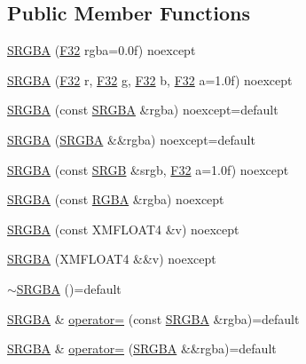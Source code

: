 \subsection*{Public Member Functions}
\begin{DoxyCompactItemize}
\item 
\hyperlink{structmage_1_1_s_r_g_b_a_ac7f39423da637e68377b5986a60855f2}{S\+R\+G\+BA} (\hyperlink{namespacemage_aa97e833b45f06d60a0a9c4fc22ae02c0}{F32} rgba=0.\+0f) noexcept
\item 
\hyperlink{structmage_1_1_s_r_g_b_a_a3497aed51744d2c91523916c0532bd86}{S\+R\+G\+BA} (\hyperlink{namespacemage_aa97e833b45f06d60a0a9c4fc22ae02c0}{F32} r, \hyperlink{namespacemage_aa97e833b45f06d60a0a9c4fc22ae02c0}{F32} g, \hyperlink{namespacemage_aa97e833b45f06d60a0a9c4fc22ae02c0}{F32} b, \hyperlink{namespacemage_aa97e833b45f06d60a0a9c4fc22ae02c0}{F32} a=1.\+0f) noexcept
\item 
\hyperlink{structmage_1_1_s_r_g_b_a_acdbff499c741c0014c578929b1bcd475}{S\+R\+G\+BA} (const \hyperlink{structmage_1_1_s_r_g_b_a}{S\+R\+G\+BA} \&rgba) noexcept=default
\item 
\hyperlink{structmage_1_1_s_r_g_b_a_ad8f7ac337a16d5bf5ae3b8b94d9fe49f}{S\+R\+G\+BA} (\hyperlink{structmage_1_1_s_r_g_b_a}{S\+R\+G\+BA} \&\&rgba) noexcept=default
\item 
\hyperlink{structmage_1_1_s_r_g_b_a_a23489bb22c8249c8d997b93e90e450da}{S\+R\+G\+BA} (const \hyperlink{structmage_1_1_s_r_g_b}{S\+R\+GB} \&srgb, \hyperlink{namespacemage_aa97e833b45f06d60a0a9c4fc22ae02c0}{F32} a=1.\+0f) noexcept
\item 
\hyperlink{structmage_1_1_s_r_g_b_a_a17b38cf5574d403a22e0bacbfc1c9416}{S\+R\+G\+BA} (const \hyperlink{structmage_1_1_r_g_b_a}{R\+G\+BA} \&rgba) noexcept
\item 
\hyperlink{structmage_1_1_s_r_g_b_a_ac111f68d4b036f56e6c5b543e9e17e35}{S\+R\+G\+BA} (const X\+M\+F\+L\+O\+A\+T4 \&v) noexcept
\item 
\hyperlink{structmage_1_1_s_r_g_b_a_a4213aa5d10b4d1e238a5422250ba316c}{S\+R\+G\+BA} (X\+M\+F\+L\+O\+A\+T4 \&\&v) noexcept
\item 
\hyperlink{structmage_1_1_s_r_g_b_a_a1a3df218eb9077b50380b831dbbfc753}{$\sim$\+S\+R\+G\+BA} ()=default
\item 
\hyperlink{structmage_1_1_s_r_g_b_a}{S\+R\+G\+BA} \& \hyperlink{structmage_1_1_s_r_g_b_a_a36892da1f5f11365241fc0b0e9f72ac5}{operator=} (const \hyperlink{structmage_1_1_s_r_g_b_a}{S\+R\+G\+BA} \&rgba)=default
\item 
\hyperlink{structmage_1_1_s_r_g_b_a}{S\+R\+G\+BA} \& \hyperlink{structmage_1_1_s_r_g_b_a_ad64e06906eb8ae30f6e4fb58d452ad7c}{operator=} (\hyperlink{structmage_1_1_s_r_g_b_a}{S\+R\+G\+BA} \&\&rgba)=default
\end{DoxyCompactItemize}


